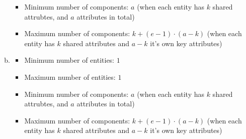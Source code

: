 \documentclass[12pt]{article}
\begin{document}
\begin{enumerate}[1.]
\begin{enumerate}[a)]
\begin{itemize}
            \item Minimum number of components: $a$ (when each entity has $k$ shared attrubtes, and $a$ attributes in total)
            \item Maximum number of components: $k + (e-1) \cdot (a-k)$ (when each entity has $k$ shared attributes and $a-k$ it's own key attributes)
        \end{itemize}

        \item

        \begin{itemize}
            \item Minimum number of entities: $1$

            \item Maximum number of entities: $1$

            \item Minimum number of components: $a$ (when each entity has $k$ shared attrubtes, and $a$ attributes in total)
            \item Maximum number of components: $k + (e-1) \cdot (a-k)$ (when each entity has $k$ shared attributes and $a-k$ it's own key attributes)
        \end{itemize}
    \end{enumerate}

\end{enumerate}
\end{document}
